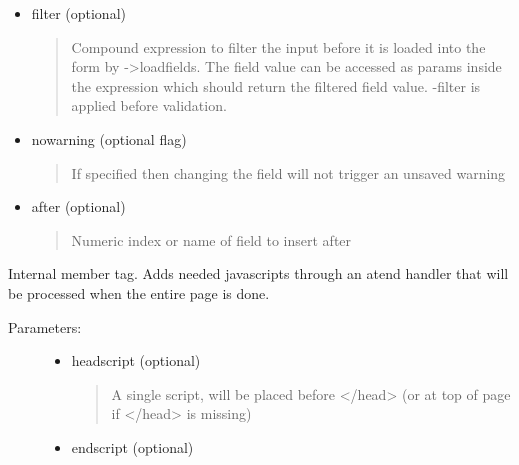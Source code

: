 \documentclass[letterpaper,10pt,english]{sphinxmanual}
\begin{document}
\begin{fulllineitems}
\begin{fulllineitems}
\begin{description}
\begin{itemize}
\item {} 
filter (optional)
\begin{quote}

Compound expression to filter the input before it is loaded into the
form by -\textgreater{}loadfields. The field value can be accessed as params
inside the expression which should return the filtered field value.
-filter is applied before validation.
\end{quote}

\item {} 
nowarning (optional flag)
\begin{quote}

If specified then changing the field will not trigger an unsaved warning
\end{quote}

\item {} 
after (optional)
\begin{quote}

Numeric index or name of field to insert after
\end{quote}

\end{itemize}

\end{description}

\end{fulllineitems}


\begin{fulllineitems}
\label{knop_form:knop_form.afterhandler}
Internal member tag. Adds needed javascripts through an atend handler that will be processed when the entire page is done.
\begin{description}
\item[{Parameters:}] \leavevmode\begin{itemize}
\item {} 
headscript (optional)
\begin{quote}

A single script, will be placed before \textless{}/head\textgreater{}  (or at top of page if \textless{}/head\textgreater{} is missing)
\end{quote}

\item {} 
endscript (optional)
\begin{quote}


\end{quote}
\end{itemize}
\end{description}
\end{fulllineitems}
\end{fulllineitems}
\end{document}
